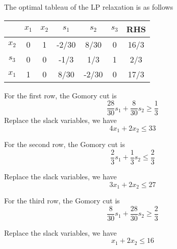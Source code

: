                     The optimal tableau of the LP relaxation is as follows

                    \begin{table}[H]
                        \centering
                        \begin{tabular}{c|ccccc|c}
                            & $x_1$ & $x_2$ & $s_1$ & $s_2$ & $s_3$ & RHS\\
                            \hline
                            $x_2$ & 0 & 1 & -2/30 & 8/30 & 0 & 16/3\\
                            $s_3$ & 0 & 0 & -1/3 & 1/3 & 1 & 2/3\\
                            $x_1$ & 1 & 0 & 8/30 & -2/30 & 0 & 17/3
                        \end{tabular}
                    \end{table}

                    For the first row, the Gomory cut is
                    \begin{equation*}
                        \frac{28}{30} s_1 + \frac{8}{30} s_2 \ge \frac{1}{3}
                    \end{equation*}
                    Replace the slack variables, we have
                    \begin{equation*}
                        4 x_1 + 2 x_2 \le 33
                    \end{equation*}

                    For the second row, the Gomory cut is
                    \begin{equation*}
                        \frac{2}{3} s_1 + \frac{1}{3} s_2 \le \frac{2}{3}
                    \end{equation*}

                    Replace the slack variables, we have
                    \begin{equation*}
                        3 x_1 + 2 x_2 \le 27
                    \end{equation*}

                    For the third row, the Gomory cut is
                    \begin{equation*}
                        \frac{8}{30}s_1 + \frac{28}{30}s_2 \ge \frac{2}{3}
                    \end{equation*}

                    Replace the slack variables, we have
                    \begin{equation*}
                        x_1 + 2 x_2 \le 16
                    \end{equation*}

